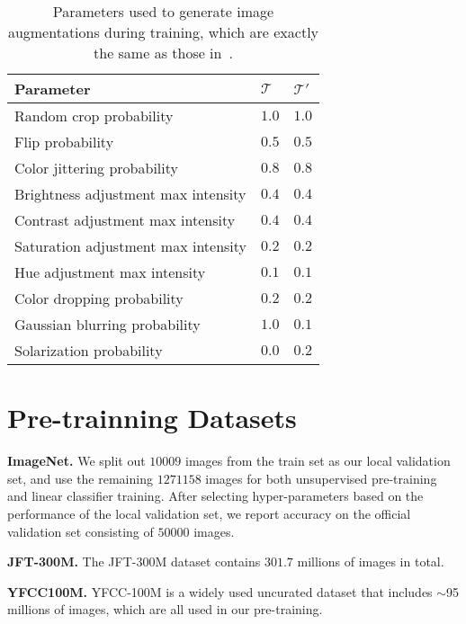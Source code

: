 \documentclass[final]{cvpr}
\newcommand\jft{JFT-300M}
\begin{document}
\begin{table}[ht]
    \small
    \centering
    \begin{tabular}{l l l} \toprule
        Parameter & $\mathcal{T}$ & $\mathcal{T}'$ \\ \midrule
        Random crop probability & $1.0$ & $1.0$ \\
        Flip probability & $0.5$ & $0.5$ \\
        Color jittering probability & $0.8$ & $0.8$ \\
        Brightness adjustment max intensity & $0.4$ & $0.4$ \\
        Contrast adjustment max intensity & $0.4$ & $0.4$ \\
        Saturation adjustment max intensity & $0.2$ & $0.2$ \\
        Hue adjustment max intensity & $0.1$ & $0.1$ \\
        Color dropping probability & $0.2$ & $0.2$ \\
        Gaussian blurring probability & $1.0$ & $0.1$ \\
        Solarization probability & $0.0$ & $0.2$ \\ \bottomrule
    \end{tabular}
     \vspace{0.5em}
    \caption{Parameters used to generate image augmentations during training, which are exactly the same as those in~\cite{grill2020bootstrap}.}
    \label{tab:transformation_distributions}
\end{table}

\section{Pre-trainning Datasets}

\noindent\textbf{ImageNet.} We split out $10009$ images from the train set as our local validation set, and use the remaining $1271158$ images for both unsupervised pre-training and linear classifier training. After selecting hyper-parameters based on the performance of the local validation set, we report accuracy on the official validation set consisting of $50000$ images.

\noindent\textbf{\jft{}.} The \jft{} dataset contains $301.7$ millions of images in total.

\noindent\textbf{YFCC100M.} YFCC-100M is a widely used uncurated dataset that includes $\sim$95 millions of images, which are all used in our pre-training. 
\end{document}
